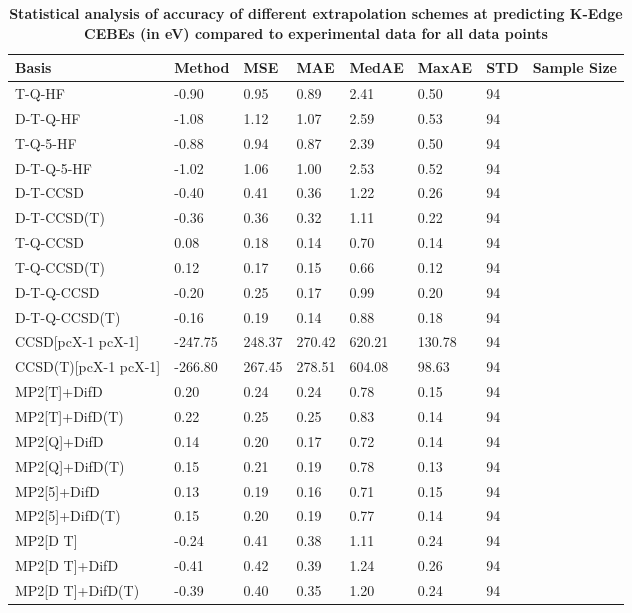 \begin{table}
  \caption{\textbf{Statistical analysis of accuracy of different extrapolation schemes at predicting K-Edge CEBEs (in eV) compared to experimental data for all data points}}
  \label{tbl:extrap-all-summary}
  \begin{tabular}{l l l l l l l l }
    \toprule
    \textbf{Basis} & \textbf{Method} & \textbf{MSE} & \textbf{MAE} & \textbf{MedAE} & \textbf{MaxAE} & \textbf{STD} & \textbf{Sample Size} \\ 
    \midrule
    T-Q-HF & -0.90 & 0.95 & 0.89 & 2.41 & 0.50 & 94 \\ 
    D-T-Q-HF & -1.08 & 1.12 & 1.07 & 2.59 & 0.53 & 94 \\ 
    T-Q-5-HF & -0.88 & 0.94 & 0.87 & 2.39 & 0.50 & 94 \\ 
    D-T-Q-5-HF & -1.02 & 1.06 & 1.00 & 2.53 & 0.52 & 94 \\ 
    D-T-CCSD & -0.40 & 0.41 & 0.36 & 1.22 & 0.26 & 94 \\ 
    D-T-CCSD(T) & -0.36 & 0.36 & 0.32 & 1.11 & 0.22 & 94 \\ 
    T-Q-CCSD & 0.08 & 0.18 & 0.14 & 0.70 & 0.14 & 94 \\ 
    T-Q-CCSD(T) & 0.12 & 0.17 & 0.15 & 0.66 & 0.12 & 94 \\ 
    D-T-Q-CCSD & -0.20 & 0.25 & 0.17 & 0.99 & 0.20 & 94 \\ 
    D-T-Q-CCSD(T) & -0.16 & 0.19 & 0.14 & 0.88 & 0.18 & 94 \\ 
    CCSD[pcX-1 pcX-1] & -247.75 & 248.37 & 270.42 & 620.21 & 130.78 & 94 \\ 
    CCSD(T)[pcX-1 pcX-1] & -266.80 & 267.45 & 278.51 & 604.08 & 98.63 & 94 \\ 
    MP2[T]+DifD & 0.20 & 0.24 & 0.24 & 0.78 & 0.15 & 94 \\ 
    MP2[T]+DifD(T) & 0.22 & 0.25 & 0.25 & 0.83 & 0.14 & 94 \\ 
    MP2[Q]+DifD & 0.14 & 0.20 & 0.17 & 0.72 & 0.14 & 94 \\ 
    MP2[Q]+DifD(T) & 0.15 & 0.21 & 0.19 & 0.78 & 0.13 & 94 \\ 
    MP2[5]+DifD & 0.13 & 0.19 & 0.16 & 0.71 & 0.15 & 94 \\ 
    MP2[5]+DifD(T) & 0.15 & 0.20 & 0.19 & 0.77 & 0.14 & 94 \\ 
    MP2[D T] & -0.24 & 0.41 & 0.38 & 1.11 & 0.24 & 94 \\ 
    MP2[D T]+DifD & -0.41 & 0.42 & 0.39 & 1.24 & 0.26 & 94 \\ 
    MP2[D T]+DifD(T) & -0.39 & 0.40 & 0.35 & 1.20 & 0.24 & 94 \\ 

\end{tabular}
\end{table}
